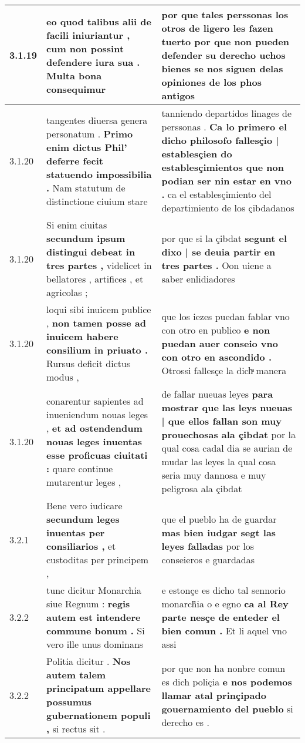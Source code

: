 \begin{tabular}{|p{1cm}|p{6.5cm}|p{6.5cm}|}
3.1.19 & eo quod talibus alii de facili iniuriantur , \textbf{ cum non possint defendere iura sua . } Multa bona consequimur & por que tales perssonas los otros de ligero les fazen tuerto \textbf{ por que non pueden defender su derecho } uchos bienes se nos siguen delas opiniones de los phos antigos \\\hline
3.1.20 & tangentes diuersa genera personatum . \textbf{ Primo enim dictus Phil’ deferre fecit statuendo impossibilia . } Nam statutum de distinctione ciuium stare & tanniendo departidos linages de perssonas . \textbf{ Ca lo primero el dicho philosofo fallesçio | establesçien do establesçimientos que non podian ser nin estar en vno . } ca el establesçimiento del departimiento de los çibdadanos \\\hline
3.1.20 & Si enim ciuitas \textbf{ secundum ipsum distingui debeat in tres partes , } videlicet in bellatores , artifices , et agricolas ; & por que si la çibdat \textbf{ segunt el dixo | se deuia partir en tres partes . } Oon uiene a saber enlidiadores \\\hline
3.1.20 & loqui sibi inuicem publice , \textbf{ non tamen posse ad inuicem habere consilium in priuato . } Rursus deficit dictus modus , & que los iezes puedan fablar vno con otro en publico \textbf{ e non puedan auer conseio vno con otro en ascondido . } Otrossi fallesçe la dichͣ manera \\\hline
3.1.20 & conarentur sapientes ad inueniendum nouas leges , \textbf{ et ad ostendendum nouas leges inuentas esse proficuas ciuitati : } quare continue mutarentur leges , & de fallar nueuas leyes \textbf{ para mostrar que las leys nueuas | que ellos fallan son muy prouechosas ala çibdat } por la qual cosa cadal dia se aurian de mudar las leyes la qual cosa seria muy dannosa e muy peligrosa ala çibdat \\\hline
3.2.1 & Bene vero iudicare \textbf{ secundum leges inuentas per consiliarios , } et custoditas per principem , & que el pueblo ha de guardar \textbf{ mas bien iudgar segt las leyes falladas } por los conseieros e guardadas \\\hline
3.2.2 & tunc dicitur Monarchia siue Regnum : \textbf{ regis autem est intendere commune bonum . } Si vero ille unus dominans & e estonçe es dicho tal sennorio monarch̃ia o e egno \textbf{ ca al Rey parte nesçe de enteder el bien comun . } Et li aquel vno assi \\\hline
3.2.2 & Politia dicitur . \textbf{ Nos autem talem principatum appellare possumus gubernationem populi , } si rectus sit . & por que non ha nonbre comun es dich poliçia \textbf{ e nos podemos llamar atal prinçipado gouernamiento del pueblo } si derecho es . \\\hline

\end{tabular}
